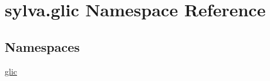 \hypertarget{namespacesylva_1_1glic}{}\section{sylva.\+glic Namespace Reference}
\label{namespacesylva_1_1glic}
\subsection*{Namespaces}
\begin{DoxyCompactItemize}
\item 
 \hyperlink{namespacesylva_1_1glic_1_1glic}{glic}
\end{DoxyCompactItemize}
